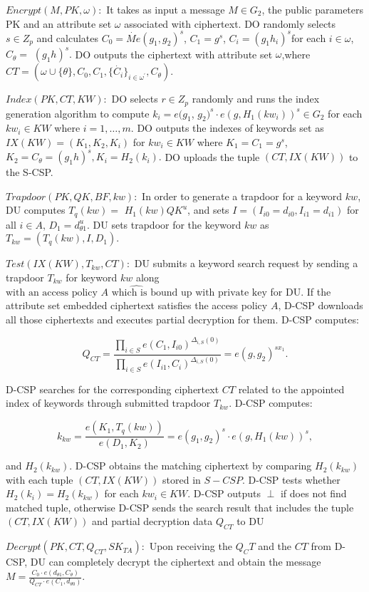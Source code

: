 \documentclass[runningheads]{llncs}
\begin{document}
$Encrypt(M,PK,\omega){:}$ It takes as input a message $M\in G_2$, the public parameters PK and an attribute set $\omega$ associated with ciphertext. DO randomly selects $s\in Z_p$ and calculates $C_0= \dot {Me}( g_1, g_2) ^s$, $C_1= g^s$, $C_i= \left ( g_1h_i\right ) ^s$for each $i\in \omega$, $C_\theta =$ $(g_{1}h)^{s}.$ DO outputs the ciphertext with attribute set $\omega$,where $CT=(\omega\cup\{\theta\},C_{0},C_{1},\{\dot{C_{i}}\}_{i\in\omega^{\prime}},C_{\theta}).$

$Index(PK,CT,KW){:}$ DO selects $r\in Z_p$ randomly and runs the index generation algorithm to compute $k_i=e(g_1$, $g_2) ^s\cdot e( g, H_1( kw_i) ) ^s\in G_2$ for each $kw_i\in KW$ where $i=1,\ldots,m.$ DO outputs the indexes of keywords set as $IX(KW){=}(K_{1},K_{2},K_{i})$ for $kw_i\in KW$ where $K_1=C_1=g^{s}$, $K_2= C_\theta = ( g_1h) ^s, K_i= H_2( k_i) .$ DO uploads the tuple $(CT,IX(KW))$ to the S-CSP.

$Trapdoor(PK,QK,BF,kw){:}$ In order to generate a trapdoor for a keyword $kw$, DU computes $T_q(kw)=$ $H_1(kw)QK^u$, and sets $I=(I_{i0}=d_{i0},I_{i1}=d_{i1})$ for all $i\in A$, $D_1=d_{\theta1}^u.$ DU sets trapdoor for the keyword $kw$ as $T_{kw}=(T_q(kw),I,D_1).$

$Test(IX(KW),T_{kw},CT){:}$ DU submits a keyword search request by sending a trapdoor $T_{kw}$ for keyword $kw$ along $\hat{\text{with an access policy }A\text{ which is bound up with private key}}$ for DU. If the attribute set embedded ciphertext satisfies the access policy $A$, D-CSP downloads all those ciphertexts and executes partial decryption for them. D-CSP computes:

$$Q_{CT}=\frac{\prod_{i\in S}e(C_1,I_{i0})^{\Delta_{i,S}(0)}}{\prod_{i\in S}e(I_{i1},C_i)^{\Delta_{i,S}(0)}}=e(g,g_2)^{sx_1}.$$

D-CSP searches for the corresponding ciphertext $CT$ related to the appointed index of keywords through submitted trapdoor $T_{kw}.$ D-CSP computes:


$$k_{kw}=\frac{e(K_1,T_q(kw))}{e(D_1,K_2)}=e(g_1,g_2)^s\cdot e(g,H_1(kw))^s,$$

and $H_2(k_{kw}).$ D-CSP obtains the matching ciphertext by comparing $H_2(k_{kw})$ with each tuple $(CT,IX(KW))$ stored in $S-CSP.$ D-CSP tests whether $H_2(k_i)=H_2(k_{kw})$ for each $kw_i\in KW.$ D-CSP outputs $\perp$ if does not find matched tuple, otherwise D-CSP sends the search result that includes the tuple $(CT,IX(KW))$ and partial decryption data $Q_{CT}$ to DU

$Decrypt(PK,CT,Q_{CT},SK_{TA}){:}$ Upon receiving the $Q_CT$ and the $CT$ from D-CSP, DU can completely decrypt the ciphertext and obtain the message $M=\frac{C_0\cdot e(d_{\theta1},C_\theta)}{Q_{CT}\cdot e(C_1,d_{\theta0})}.$
\end{document}
